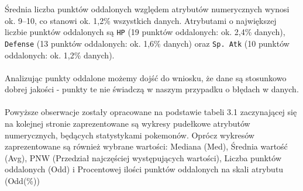 \documentclass[12pt, a4paper]{report}
\begin{document}
Średnia liczba punktów oddalonych względem atrybutów numerycznych wynosi ok. 9--10, co stanowi ok. 1,2\% wszystkich danych. Atrybutami o największej liczbie punktów oddalonych są \texttt{HP} (19 punktów oddalonych: ok. 2,4\% danych), \texttt{Defense} (13 punktów oddalonych: ok. 1,6\% danych) oraz \texttt{Sp. Atk} (10 punktów oddalonych: ok. 1,2\% danych).\\\\ \noindent
Analizując punkty oddalone możemy dojść do wniosku, że dane są stosunkowo dobrej jakości - punkty te nie świadczą w naszym przypadku o błędach w danych.\\\\ \noindent
Powyższe obserwacje zostały opracowane na podstawie tabeli 3.1 zaczynającej się na kolejnej stronie zaprezentowane są wykresy pudełkowe atrybutów numerycznych, będących statystykami pokemonów. Oprócz wykresów zaprezentowane są również wybrane wartości: Mediana (Med), Średnia wartość (Avg), PNW (Przedział najczęściej występujących wartości), Liczba punktów oddalonych (Odd) i Procentowej ilości punktów oddalonych na skali atrybutu (Odd(\%))

\end{document}
